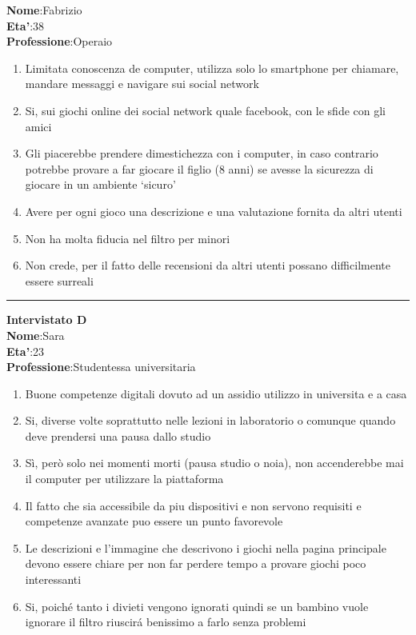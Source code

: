 \documentclass[../Report.tex]{subfiles}
\begin{document}
    \textbf{Nome}:Fabrizio\\
    \textbf{Eta'}:38\\
    \textbf{Professione}:Operaio\\

    \begin{enumerate}
        \item Limitata conoscenza de computer, utilizza solo lo smartphone per chiamare, mandare messaggi e navigare sui social network
        \item Si, sui giochi online dei social network quale facebook, con le sfide con gli amici
        \item Gli piacerebbe prendere dimestichezza con i computer, in caso contrario potrebbe provare a far giocare il figlio (8 anni) se avesse la sicurezza di giocare in un ambiente ‘sicuro’
        \item Avere per ogni gioco una descrizione e una valutazione fornita da altri utenti 
        \item Non ha molta fiducia nel filtro per minori
        \item Non crede, per il fatto delle recensioni da altri utenti possano difficilmente essere surreali
    \end{enumerate}

    \hrule
    \textbf{Intervistato D}\\

    \textbf{Nome}:Sara\\
    \textbf{Eta'}:23\\
    \textbf{Professione}:Studentessa universitaria\\

    \begin{enumerate}
        \item Buone competenze digitali dovuto ad un assidio utilizzo in universita e a casa
        \item Si, diverse volte soprattutto nelle lezioni in laboratorio o comunque quando deve prendersi una pausa dallo studio
        \item Sì, però solo nei momenti morti (pausa studio o noia), non accenderebbe mai il computer per utilizzare la piattaforma
        \item Il fatto che sia accessibile da piu dispositivi e non servono requisiti e competenze avanzate puo essere un punto favorevole
        \item Le descrizioni e l’immagine che descrivono i giochi nella pagina principale devono essere chiare per non far perdere tempo a provare giochi poco interessanti
        \item Si, poiché tanto i divieti vengono ignorati quindi se un bambino vuole ignorare il filtro riuscirá benissimo a farlo senza problemi
        
    \end{enumerate}
\end{document}

